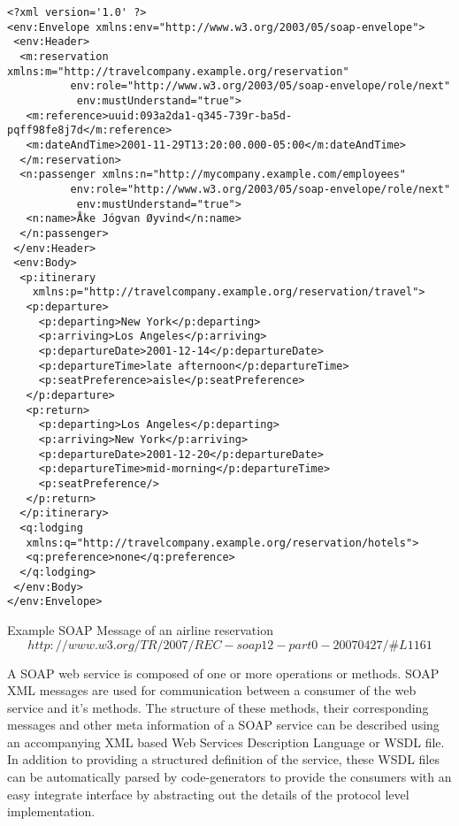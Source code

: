 \documentclass[runningheads,a4paper]{llncs}
\begin{document}
\lstset{language=XML}
\begin{lstlisting}
<?xml version='1.0' ?>
<env:Envelope xmlns:env="http://www.w3.org/2003/05/soap-envelope">
 <env:Header>
  <m:reservation xmlns:m="http://travelcompany.example.org/reservation"
          env:role="http://www.w3.org/2003/05/soap-envelope/role/next"
           env:mustUnderstand="true">
   <m:reference>uuid:093a2da1-q345-739r-ba5d-pqff98fe8j7d</m:reference>
   <m:dateAndTime>2001-11-29T13:20:00.000-05:00</m:dateAndTime>
  </m:reservation>
  <n:passenger xmlns:n="http://mycompany.example.com/employees"
          env:role="http://www.w3.org/2003/05/soap-envelope/role/next"
           env:mustUnderstand="true">
   <n:name>Åke Jógvan Øyvind</n:name>
  </n:passenger>
 </env:Header>
 <env:Body>
  <p:itinerary
    xmlns:p="http://travelcompany.example.org/reservation/travel">
   <p:departure>
     <p:departing>New York</p:departing>
     <p:arriving>Los Angeles</p:arriving>
     <p:departureDate>2001-12-14</p:departureDate>
     <p:departureTime>late afternoon</p:departureTime>
     <p:seatPreference>aisle</p:seatPreference>
   </p:departure>
   <p:return>
     <p:departing>Los Angeles</p:departing>
     <p:arriving>New York</p:arriving>
     <p:departureDate>2001-12-20</p:departureDate>
     <p:departureTime>mid-morning</p:departureTime>
     <p:seatPreference/>
   </p:return>
  </p:itinerary>
  <q:lodging
   xmlns:q="http://travelcompany.example.org/reservation/hotels">
   <q:preference>none</q:preference>
  </q:lodging>
 </env:Body>
</env:Envelope>
\end{lstlisting}

Example SOAP Message of an airline reservation \[http://www.w3.org/TR/2007/REC-soap12-part0-20070427/\#L1161\]


A SOAP web service is composed of one or more operations or methods. SOAP XML messages are used for communication between a consumer of the web service and it’s methods. The structure of these methods, their corresponding messages and other meta information of a SOAP service can be described using an accompanying XML based Web Services Description Language or WSDL file. In addition to providing a structured definition of the service, these WSDL files can be automatically parsed by code-generators to provide the consumers with an easy integrate interface by abstracting out the details of the protocol level implementation.

\end{document}
